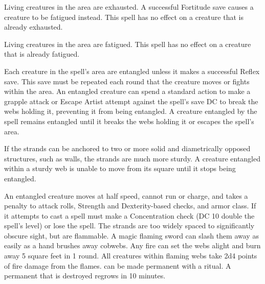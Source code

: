 \spelldur{\durshort}
\begin{spelleffect}
  Living creatures in the area are exhausted. A successful Fortitude save causes a creature to be fatigued instead. This spell has no effect on a creature that is already exhausted.
\end{spelleffect}

\spelldur{\durshort}
\begin{spelleffect}
  Living creatures in the area are fatigued. This spell has no effect on a creature that is already fatigued.
\end{spelleffect}

\spellrng{\rngclose}
\begin{spelleffect}
  Each creature in the spell's area are entangled unless it makes a successful Reflex save. This save must be repeated each round that the creature moves or fights within the area. An entangled creature can spend a standard action to make a grapple attack or Escape Artist attempt against the spell's save DC to break the webs holding it, preventing it from being entangled. A creature entangled by the spell remains entangled until it breaks the webs holding it or escapes the spell's area.
  \par If the strands can be anchored to two or more solid and diametrically opposed structures, such as walls, the strands are much more sturdy. A creature entangled within a sturdy web is unable to move from its square until it stops being entangled.
\end{spelleffect}
\begin{spellnotes}
  An entangled creature moves at half speed, cannot run or charge, and takes a  penalty to attack rolls, Strength and Dexterity-based checks, and armor class. If it attempts to cast a spell must make a Concentration check (DC 10 \add double the spell's level) or lose the spell.
  The strands are too widely spaced to significantly obscure sight, but are flammable. A magic flaming sword can slash them away as easily as a hand brushes away cobwebs. Any fire can set the webs alight and burn away 5 square feet in 1 round. All creatures within flaming webs take 2d4 points of fire damage from the flames.
   can be made permanent with a  ritual. A permanent  that is destroyed regrows in 10 minutes.
\end{spellnotes}

